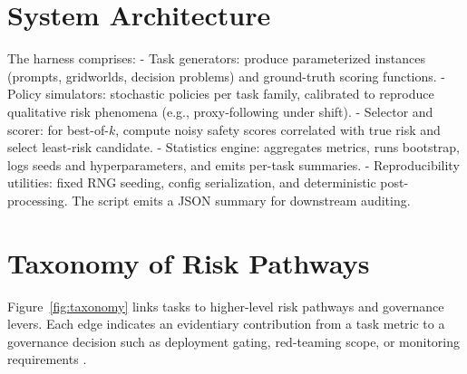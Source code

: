 \documentclass[11pt]{article}
\begin{document}
\section{System Architecture}
The harness comprises:
- Task generators: produce parameterized instances (prompts, gridworlds, decision problems) and ground-truth scoring functions.
- Policy simulators: stochastic policies per task family, calibrated to reproduce qualitative risk phenomena (e.g., proxy-following under shift).
- Selector and scorer: for best-of-$k$, compute noisy safety scores correlated with true risk and select least-risk candidate.
- Statistics engine: aggregates metrics, runs bootstrap, logs seeds and hyperparameters, and emits per-task summaries.
- Reproducibility utilities: fixed RNG seeding, config serialization, and deterministic post-processing. The script emits a JSON summary for downstream auditing.

\section{Taxonomy of Risk Pathways}
Figure~\ref{fig:taxonomy} links tasks to higher-level risk pathways and governance levers. Each edge indicates an evidentiary contribution from a task metric to a governance decision such as deployment gating, red-teaming scope, or monitoring requirements \citep{Mitchell2019ModelCards,Weidinger2021Risks,Shevlane2023ExtremeRiskEval,Bommasani2021}.
\end{document}
